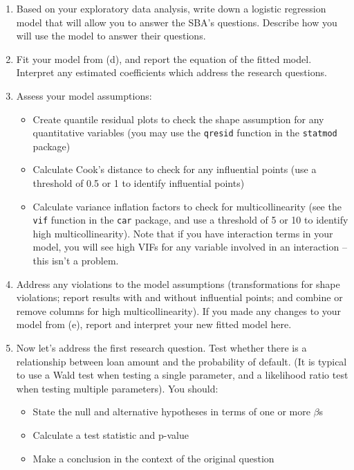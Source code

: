 \documentclass[11pt]{article}
\begin{document}
\begin{enumerate}
\begin{enumerate}
\begin{itemize}
\end{itemize}
\item Based on your exploratory data analysis, write down a logistic regression model that will allow you to answer the SBA's questions. Describe how you will use the model to answer their questions.
\item Fit your model from (d), and report the equation of the fitted model. Interpret any estimated coefficients which address the research questions.
\item Assess your model assumptions:
\begin{itemize}
\item Create quantile residual plots to check the shape assumption for any quantitative variables (you may use the \texttt{qresid} function in the \texttt{statmod} package)
\item Calculate Cook's distance to check for any influential points (use a threshold of 0.5 or 1 to identify influential points)
\item Calculate variance inflation factors to check for multicollinearity (see the \texttt{vif} function in the \texttt{car} package, and use a threshold of 5 or 10 to identify high multicollinearity). Note that if you have interaction terms in your model, you will see high VIFs for any variable involved in an interaction -- this isn't a problem.
\end{itemize}
\item Address any violations to the model assumptions (transformations for shape violations; report results with and without influential points; and combine or remove columns for high multicollinearity). If you made any changes to your model from (e), report and interpret your new fitted model here.

\item Now let's address the first research question. Test whether there is a relationship between loan amount and the probability of default. (It is typical to use a Wald test when testing a single parameter, and a likelihood ratio test when testing multiple parameters). You should:
\begin{itemize}
\item State the null and alternative hypotheses in terms of one or more $\beta$s
\item Calculate a test statistic and p-value
\item Make a conclusion in the context of the original question
\end{itemize}


\end{enumerate}
\end{enumerate}
\end{document}
